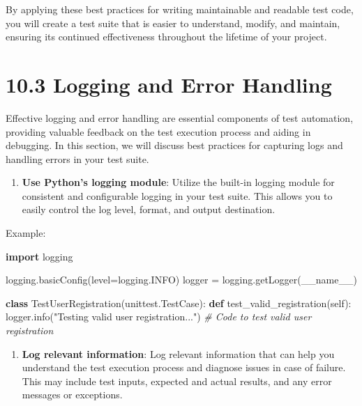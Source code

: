 \documentclass[
  paper=a4,
  ,captions=tableheading
]{scrartcl}
\newenvironment{Shaded}{}{}
\newcommand{\CommentTok}[1]{\textcolor[rgb]{0.38,0.63,0.69}{\textit{#1}}}
\newcommand{\ImportTok}[1]{\textcolor[rgb]{0.00,0.50,0.00}{\textbf{#1}}}
\newcommand{\KeywordTok}[1]{\textcolor[rgb]{0.00,0.44,0.13}{\textbf{#1}}}
\newcommand{\NormalTok}[1]{#1}
\newcommand{\OperatorTok}[1]{\textcolor[rgb]{0.40,0.40,0.40}{#1}}
\newcommand{\StringTok}[1]{\textcolor[rgb]{0.25,0.44,0.63}{#1}}
\newcommand{\VariableTok}[1]{\textcolor[rgb]{0.10,0.09,0.49}{#1}}
\providecommand{\tightlist}{%
  \setlength{\itemsep}{0pt}\setlength{\parskip}{0pt}}
\begin{document}
By applying these best practices for writing maintainable and readable
test code, you will create a test suite that is easier to understand,
modify, and maintain, ensuring its continued effectiveness throughout
the lifetime of your project.

\hypertarget{logging-and-error-handling}{%
\section{10.3 Logging and Error
Handling}\label{logging-and-error-handling}}

Effective logging and error handling are essential components of test
automation, providing valuable feedback on the test execution process
and aiding in debugging. In this section, we will discuss best practices
for capturing logs and handling errors in your test suite.

\begin{enumerate}
\def\labelenumi{\arabic{enumi}.}
\tightlist
\item
  \textbf{Use Python's logging module}: Utilize the built-in logging
  module for consistent and configurable logging in your test suite.
  This allows you to easily control the log level, format, and output
  destination.
\end{enumerate}

Example:

\begin{Shaded}
\begin{Highlighting}[]
\ImportTok{import}\NormalTok{ logging}

\NormalTok{logging.basicConfig(level}\OperatorTok{=}\NormalTok{logging.INFO)}
\NormalTok{logger }\OperatorTok{=}\NormalTok{ logging.getLogger(}\VariableTok{\_\_name\_\_}\NormalTok{)}

\KeywordTok{class}\NormalTok{ TestUserRegistration(unittest.TestCase):}
    \KeywordTok{def}\NormalTok{ test\_valid\_registration(}\VariableTok{self}\NormalTok{):}
\NormalTok{        logger.info(}\StringTok{"Testing valid user registration..."}\NormalTok{)}
        \CommentTok{\# Code to test valid user registration}
\end{Highlighting}
\end{Shaded}

\begin{enumerate}
\def\labelenumi{\arabic{enumi}.}
\setcounter{enumi}{1}
\tightlist
\item
  \textbf{Log relevant information}: Log relevant information that can
  help you understand the test execution process and diagnose issues in
  case of failure. This may include test inputs, expected and actual
  results, and any error messages or exceptions.
\end{enumerate}
\end{document}
